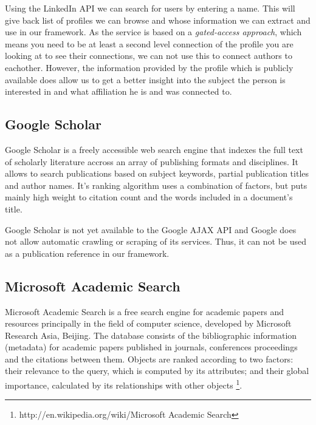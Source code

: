 Using the LinkedIn API we can search for users by entering a name. This will give back list of profiles we can browse and whose information we can extract and use in our framework. As the service is based on a \textit{gated-access approach}, which means you need to be at least a second level connection of the profile you are looking at to see their connections, we can not use this to connect authors to eachother. However, the information provided by the profile which is publicly available does allow us to get a better insight into the subject the person is interested in and what affiliation he is and was connected to.


\subsection{Google Scholar}

Google Scholar is a freely accessible web search engine that indexes the full text of scholarly literature accross an array of publishing formats and disciplines. It allows to search publications based on subject keywords, partial publication titles and author names. It's ranking algorithm uses a combination of factors, but puts mainly high weight to citation count and the words included in a document's title.

Google Scholar is not yet available to the Google AJAX API and Google does not allow automatic crawling or scraping of its services. Thus, it can not be used as a publication reference in our framework.

\subsection{Microsoft Academic Search}

Microsoft Academic Search is a free search engine for academic papers and resources principally in the field of computer science, developed by Microsoft Research Asia, Beijing. The database consists of the bibliographic information (metadata) for academic papers published in journals, conferences proceedings and the citations between them. Objects are ranked according to two factors: their relevance to the query, which is computed by its attributes; and their global importance, calculated by its relationships with other objects \footnote{http://en.wikipedia.org/wiki/Microsoft Academic Search}.

